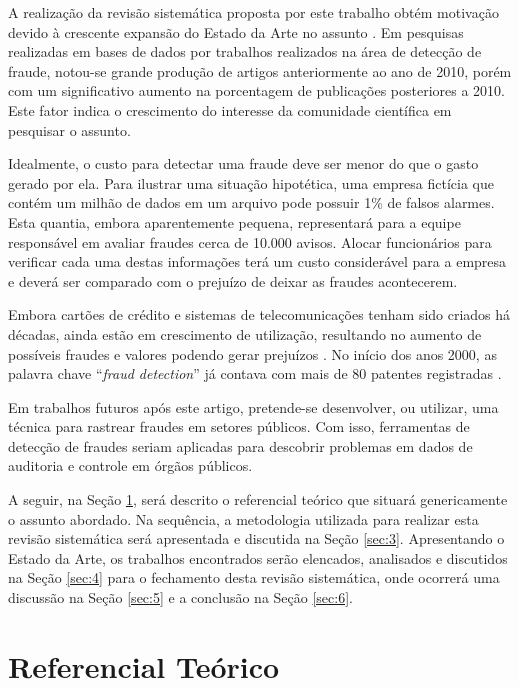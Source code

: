 \documentclass[smallextended]{svjour3}
\begin{document}
A realização da revisão sistemática proposta por este trabalho obtém motivação devido à crescente expansão do Estado da Arte no assunto \citep{Pejic-Bach2010}. Em pesquisas realizadas em bases de dados por trabalhos realizados na área de detecção de fraude, notou-se grande produção de artigos anteriormente ao ano de 2010, porém com um significativo aumento na porcentagem de publicações posteriores a 2010. Este fator indica o crescimento do interesse da comunidade científica em pesquisar o assunto.

Idealmente, o custo para detectar uma fraude deve ser menor do que o gasto gerado por ela. Para ilustrar uma situação hipotética, uma empresa fictícia que contém um milhão de dados em um arquivo pode possuir 1\% de falsos alarmes. Esta quantia, embora aparentemente pequena, representará para a equipe responsável em avaliar fraudes cerca de 10.000 avisos. Alocar funcionários para verificar cada uma destas informações terá um custo considerável para a empresa e deverá ser comparado com o prejuízo de deixar as fraudes acontecerem.

Embora cartões de crédito e sistemas de telecomunicações tenham sido criados há décadas, ainda estão em crescimento de utilização, resultando no aumento de possíveis fraudes e valores podendo gerar prejuízos \citep{Abdallah2016}. No início dos anos 2000, as palavra chave “\emph{fraud detection}” já contava com mais de 80 patentes registradas \citep{Bolton2002}.

Em trabalhos futuros após este artigo, pretende-se desenvolver, ou utilizar, uma técnica para rastrear fraudes em setores públicos. Com isso, ferramentas de detecção de fraudes seriam aplicadas para descobrir problemas em dados de auditoria e controle em órgãos públicos.

A seguir, na Seção \ref{sec:2}, será descrito o referencial teórico que situará genericamente o assunto abordado. Na sequência, a metodologia utilizada para realizar esta revisão sistemática será apresentada e discutida na Seção \ref{sec:3}. Apresentando o Estado da Arte, os trabalhos encontrados serão elencados, analisados e discutidos na Seção \ref{sec:4} para o fechamento desta revisão sistemática, onde ocorrerá uma discussão na Seção \ref{sec:5} e a conclusão na Seção \ref{sec:6}.

\section{Referencial Teórico}
\label{sec:2}
\end{document}
